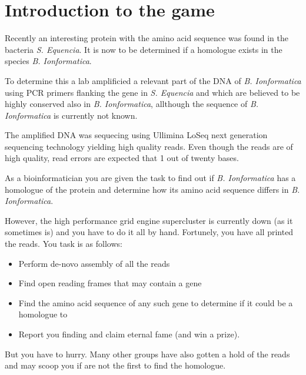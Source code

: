 \section*{Introduction to the game}

Recently an interesting protein with the amino acid sequence \mutantprotein was found in the bacteria \emph{S. Equencia}. 
It is now to be determined if a homologue exists in the species \emph{B. Ionformatica}.

To determine this a lab amplificied a relevant part of the DNA of \emph{B. Ionformatica} using PCR primers flanking
the gene in \emph{S. Equencia} and which are believed to be highly conserved also in \emph{B. Ionformatica}, allthough
the sequence of \emph{B. Ionformatica} is currently not known.

The amplified DNA was sequecing using Ullimina LoSeq next generation sequencing technology yielding \numberofreads high quality reads.  
Even though the reads are of high quality, read errors are expected that 1 out of twenty bases.  

As a bioinformatician you are given the task to find out if \emph{B. Ionformatica} has a homologue of the protein \mutantprotein and 
determine how its amino acid sequence differs in \emph{B. Ionformatica}.

However, the high performance grid engine supercluster is currently down (as it sometimes is) and you have to do it all by hand. 
Fortunely, you have all printed the reads. 
You task is as follows:



\begin{itemize} 
\item Perform de-novo assembly of all the reads
\item Find open reading frames that may contain a gene
\item Find the amino acid sequence of any such gene to determine if it could be a homologue to \mutantprotein
\item Report you finding and claim eternal fame (and win a prize).
\end{itemize}

But you have to hurry. Many other groups have also gotten a hold of the reads and 
may scoop you if are not the first to find the homologue.   


